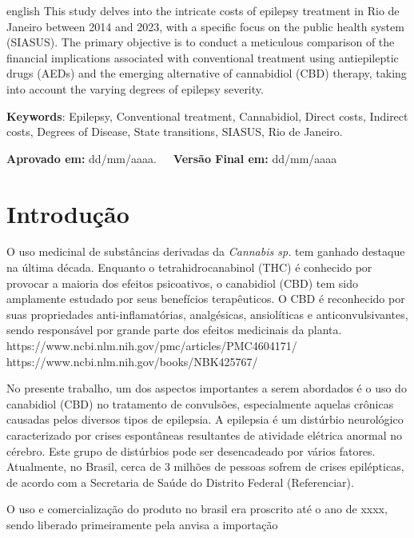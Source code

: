 \documentclass[article,a4paper,12pt,brazil,sumario=tradicional]{abntex2}
\begin{document}
\vspace{-.3cm}
\begin{hyphenrules}{english}
\noindent This study delves into the intricate costs of epilepsy treatment in Rio de Janeiro between 2014 and 2023, with a specific focus on the public health system (SIASUS). The primary objective is to conduct a meticulous comparison of the financial implications associated with conventional treatment using antiepileptic drugs (AEDs) and the emerging alternative of cannabidiol (CBD) therapy, taking into account the varying degrees of epilepsy severity.
\end{hyphenrules}
\vspace{.4cm}
 
\noindent \textbf{Keywords}: Epilepsy, Conventional treatment, Cannabidiol, Direct costs, Indirect costs, Degrees of Disease, State transitions, SIASUS, Rio de Janeiro.

\vspace{.4cm}

\noindent \textbf{Aprovado em:} dd/mm/aaaa.~~~\textbf{Versão Final em:} dd/mm/aaaa

\section{Introdução}

O uso medicinal de substâncias derivadas da \textit{Cannabis sp.} tem ganhado destaque na última década. Enquanto o tetrahidrocanabinol (THC) é conhecido por provocar a maioria dos efeitos psicoativos, o canabidiol (CBD) tem sido amplamente estudado por seus benefícios terapêuticos. O CBD é reconhecido por suas propriedades anti-inflamatórias, analgésicas, ansiolíticas e anticonvulsivantes, sendo responsável por grande parte dos efeitos medicinais da planta.
https://www.ncbi.nlm.nih.gov/pmc/articles/PMC4604171/
https://www.ncbi.nlm.nih.gov/books/NBK425767/

No presente trabalho, um dos aspectos importantes a serem abordados é o uso do canabidiol (CBD) no tratamento de convulsões, especialmente aquelas crônicas causadas pelos diversos tipos de epilepsia. A epilepsia é um distúrbio neurológico caracterizado por crises espontâneas resultantes de atividade elétrica anormal no cérebro. Este grupo de distúrbios pode ser desencadeado por vários fatores. Atualmente, no Brasil, cerca de 3 milhões de pessoas sofrem de crises epilépticas, de acordo com a Secretaria de Saúde do Distrito Federal (Referenciar).

O uso e comercialização do produto no brasil era proscrito até o ano de xxxx, sendo liberado primeiramente pela anvisa a importação 
\end{document}
